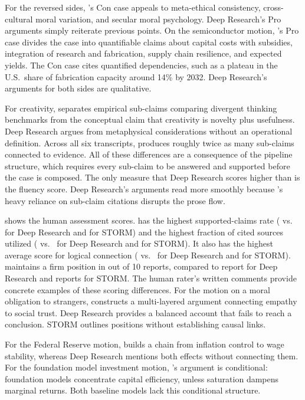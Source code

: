 For the reversed sides, \sys{}'s Con case appeals to meta-ethical consistency, cross-cultural moral variation, and secular moral psychology. Deep Research's Pro arguments simply reiterate previous points. On the semiconductor motion, \sys{}'s Pro case divides the case into quantifiable claims about capital costs with subsidies, integration of research and fabrication, supply chain resilience, and expected yields. The Con case cites quantified dependencies, such as a plateau in the U.S.\ share of fabrication capacity around 14\% by 2032. Deep Research's arguments for both sides are qualitative.

For creativity, \sys{} separates empirical sub-claims comparing divergent thinking benchmarks from the conceptual claim that creativity is novelty plus usefulness. Deep Research argues from metaphysical considerations without an operational definition. Across all six transcripts, \sys{} produces roughly twice as many sub-claims connected to evidence. All of these differences are a consequence of the pipeline structure, which requires every sub-claim to be answered and supported before the case is composed. The only measure that Deep Research scores higher than \sys{} is the fluency score. Deep Research's arguments read more smoothly because \sys{}'s heavy reliance on sub-claim citations disrupts the prose flow.

 shows the human assessment scores. \sys{} has the highest supported-claims rate (\humSupportedDC{} vs.\ \humSupportedOAI{} for Deep Research and \humSupportedStorm{} for STORM) and the highest fraction of cited sources utilized (\humUtilDC{} vs.\ \humUtilOAI{} for Deep Research and \humUtilStorm{} for STORM). It also has the highest average score for logical connection (\humLogicDC{} vs.\ \humLogicOAI{} for Deep Research and \humLogicStorm{} for STORM). \sys{} maintains a firm position in \humStanceDC{} out of 10 reports, compared to \humStanceOAI{} report for Deep Research and \humStanceStorm{} reports for STORM. The human rater's written comments provide concrete examples of these scoring differences. For the motion on a moral obligation to strangers, \sys{} constructs a multi-layered argument connecting empathy to social trust. Deep Research provides a balanced account that fails to reach a conclusion. STORM outlines positions without establishing causal links.

For the Federal Reserve motion, \sys{} builds a chain from inflation control to wage stability, whereas Deep Research mentions both effects without connecting them. For the foundation model investment motion, \sys{}'s argument is conditional: foundation models concentrate capital efficiency, unless saturation dampens marginal returns. Both baseline models lack this conditional structure.

